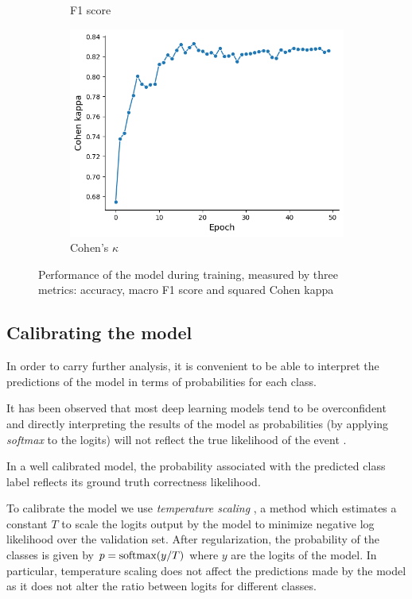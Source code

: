 \begin{figure}[tb]
\begin{subfigure}[b]{0.32\textwidth}
         \caption{F1 score}
         \label{fig:f1}
     \end{subfigure}
     \hfill
     \begin{subfigure}[b]{0.32\textwidth}
         \centering
         \includegraphics[width=\textwidth]{figures/chapter5/metrics/kappa.png}
         \caption{Cohen's $\kappa$}
         \label{fig:kappa}
     \end{subfigure}
        \caption{Performance of the model during training, measured by three metrics: accuracy, macro F1 score and squared Cohen kappa}
        \label{fig:metrics}
\end{figure}

\subsection{Calibrating the model}
In order to carry further analysis, it is convenient to be able to interpret the predictions of the model in terms of probabilities for each class.

It has been observed that most deep learning models tend to be overconfident and directly interpreting the results of the model as probabilities (by applying \textit{softmax} to the logits) will not reflect the true likelihood of the event \cite{guo2017calibration}.

In a well calibrated model, the probability associated with the predicted class label reflects its ground truth correctness likelihood.

To calibrate the model we use \textit{temperature scaling} \cite{guo2017calibration}, a method which estimates a constant \( T \) to scale the logits output by the model to minimize negative log likelihood over the validation set. After regularization, the probability of the classes is given by \( p = \operatorname{softmax}(y / T) \) where \( y \) are the logits of the model. In particular, temperature scaling does not affect the predictions made by the model as it does not alter the ratio between logits for different classes.

